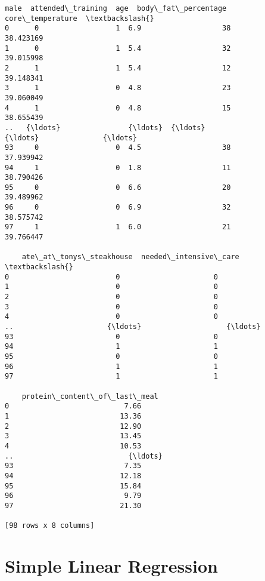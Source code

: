 \documentclass[11pt]{article}
\makeatletter
\newcommand{\boxspacing}{\kern\kvtcb@left@rule\kern\kvtcb@boxsep}
\newcommand{\prompt}[4]{
        {\ttfamily\llap{{\color{#2}[#3]:\hspace{3pt}#4}}\vspace{-\baselineskip}}
    }
\makeatother
\begin{document}
            \begin{tcolorbox}[breakable, size=fbox, boxrule=.5pt, pad at break*=1mm, opacityfill=0]
\prompt{Out}{outcolor}{1}{\boxspacing}
\begin{Verbatim}[commandchars=\\\{\}]
    male  attended\_training  age  body\_fat\_percentage  core\_temperature  \textbackslash{}
0      0                  1  6.9                   38         38.423169
1      0                  1  5.4                   32         39.015998
2      1                  1  5.4                   12         39.148341
3      1                  0  4.8                   23         39.060049
4      1                  0  4.8                   15         38.655439
..   {\ldots}                {\ldots}  {\ldots}                  {\ldots}               {\ldots}
93     0                  0  4.5                   38         37.939942
94     1                  0  1.8                   11         38.790426
95     0                  0  6.6                   20         39.489962
96     0                  0  6.9                   32         38.575742
97     1                  1  6.0                   21         39.766447

    ate\_at\_tonys\_steakhouse  needed\_intensive\_care  \textbackslash{}
0                         0                      0
1                         0                      0
2                         0                      0
3                         0                      0
4                         0                      0
..                      {\ldots}                    {\ldots}
93                        0                      0
94                        1                      1
95                        0                      0
96                        1                      1
97                        1                      1

    protein\_content\_of\_last\_meal
0                           7.66
1                          13.36
2                          12.90
3                          13.45
4                          10.53
..                           {\ldots}
93                          7.35
94                         12.18
95                         15.84
96                          9.79
97                         21.30

[98 rows x 8 columns]
\end{Verbatim}
\end{tcolorbox}
        
    \hypertarget{simple-linear-regression}{%
\section{Simple Linear Regression}\label{simple-linear-regression}}
\end{document}
